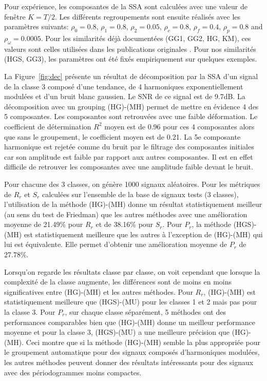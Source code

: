 \documentclass{gretsi}
\begin{document}
Pour expérience, les composantes de la SSA sont calculées avec une valeur de fenêtre $K=T/2$.
Les différents regroupements sont ensuite réalisés avec les paramètres suivants: $\rho_0=0.8$, $\rho_1=0.8$, $\rho_2=0.05$, $\rho_c=0.8$, $\rho_f=0.4$, $\rho_p=0.8$ and $\rho_\omega=0.0005$.
Pour les similarités déjà documentées (GG1, GG2, HG, KM), ces valeurs sont celles utilisées dans les publications originales \cite{abalov_14_auto, alvarez_13_auto}. Pour nos similarités (HGS, GG3), les paramètres ont été fixés empiriquement sur quelques exemples.



La Figure~\ref{fig:dec} présente un résultat de décomposition par la SSA d'un signal de la classe 3 composé d'une tendance, de 4 harmoniques exponentiellement modulées et d'un bruit blanc gaussien.
Le SNR de ce signal est de 9.7dB.
La décomposition  avec un grouping (HG)-(MH) permet de mettre en évidence 4 des 5 composantes.
Les composantes sont retrouvées avec une faible déformation. 
Le coefficient de détermination $R^2$ moyen est de 0.96 pour ces 4 composantes alors que sans le groupement, le coefficient moyen est de 0.21.
La 5e composante harmonique est rejetée comme du bruit par le filtrage des composantes initiales car son amplitude est faible par rapport aux autres composantes.
Il est en effet difficile de retrouver les composantes avec une amplitude faible devant le bruit.


Pour chacune des 3 classes, on génère 1000 signaux aléatoires.
Pour les métriques de $R_r$ et $S_r$ calculées sur l'ensemble de la base de signaux tests (3 classes), l'utilisation de la méthode (HG)-(MH) donne un résultat statistiquement meilleur (au sens du test de Friedman) que les autres méthodes avec une amélioration moyenne de 21.49\% pour $R_r$ et de 38.16\% pour $S_r$.
Pour $P_r$, la méthode (HGS)-(MH) est statistiquement meilleure que les autres à l'exception de (HG)-(MH) qui lui est équivalente.
Elle permet d'obtenir une amélioration moyenne de $P_r$ de 27.78\%.


Lorsqu'on regarde les résultats classe par classe, on voit cependant que lorsque la complexité de la classe augmente, les différences sont de moins en moins significatives entre (HG)-(MH) et les autres méthodes.
Pour $R_r$, (HG)-(MH) est statistiquement meilleure que (HGS)-(MU) pour les classes 1 et 2 mais pas pour la classe 3.
Pour $P_r$, sur chaque classe séparément, 5 méthodes ont des performances comparables bien que (HG)-(MH) donne un meilleur performance moyenne et  pour la classe 3, (HGS)-(MU) a une meilleure précision que (HG)-(MH).
Ceci montre que si la méthode (HG)-(MH) semble la plus appropriée pour le groupement automatique pour des signaux composés d'harmoniques modulées, les autres méthodes peuvent donner des résultats intéressants pour des signaux avec des périodogrammes moins compactes.
\end{document}
